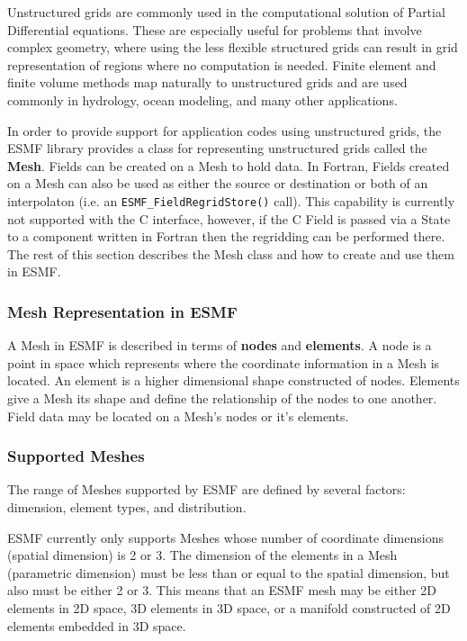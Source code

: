 
Unstructured grids are commonly used in the computational solution of Partial Differential equations.  These are especially useful for problems that involve complex geometry, where using the less flexible structured grids can
result in grid representation of regions where no computation is needed.  Finite
element and finite volume methods map naturally to unstructured grids and are used commonly
in hydrology, ocean modeling, and many other applications.

In order to provide support for application codes using unstructured grids, the ESMF library provides a class for representing 
unstructured grids called the {\bf Mesh}. Fields can be created on a Mesh to hold data. In Fortran, Fields created on a Mesh can also be used 
as either the source or destination or both of an interpolaton (i.e. an {\tt ESMF\_FieldRegridStore()} call). This capability is currently
not supported with the C interface, however, if the C Field is passed via a State to a component written in Fortran then the regridding
can be performed there. The rest of this section describes the Mesh class and how to create and use them in ESMF. 

\subsubsection{Mesh Representation in ESMF}

A Mesh in ESMF is described in terms of {\bf nodes} and {\bf elements}. A node is a point in space which represents where the coordinate 
information in a Mesh is located. An element is a higher dimensional shape constructed of nodes. Elements give a Mesh its shape and define the relationship of the nodes to one another. Field data may be located on a Mesh's nodes or it's elements. 

\subsubsection{Supported Meshes}

The range of Meshes supported by ESMF are defined by several factors: dimension, element types, and distribution.

ESMF currently only supports Meshes whose number of coordinate dimensions (spatial dimension) is 2 or 3. The dimension of the elements in a Mesh
(parametric dimension) must be less than or equal to the spatial dimension, but also must be either 2 or 3. This means that an ESMF mesh may be
either 2D elements in 2D space, 3D elements in 3D space, or a manifold constructed of 2D elements embedded in 3D space. 

